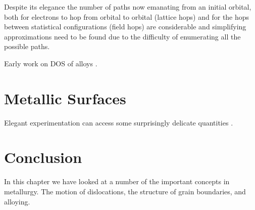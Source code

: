 Despite its elegance the number of paths now emanating from an initial orbital, both
for electrons to hop from orbital to orbital (lattice hops) and for the hops between 
statistical configurations (field hops) are considerable and simplifying approximations 
need to be found due to the difficulty of enumerating all the possible paths.

Early work on DOS of alloys \cite{cubiotti77}. 

\section{Metallic Surfaces}

Elegant experimentation can access some surprisingly delicate quantities \cite{whipp34}.

\section{Conclusion}
In this chapter we have looked at a number of the important concepts
in metallurgy. The motion of dislocations, 
the structure of grain boundaries, and alloying. 


